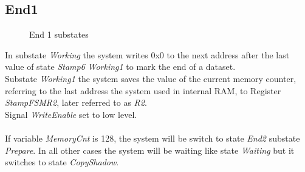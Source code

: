 \subsection{End1}
\begin{figure}[htb] 
\begin{center}
\end{center}
\caption{End 1 substates}
\end{figure}
\noindent
In substate \textit{Working} the system writes 0x0 to the next address after the last value of state \textit{Stamp6} \textit{Working1} to mark the end of a dataset. \\
Substate \textit{Working1} the system saves the value of the current memory counter, referring to the last address the system used in internal RAM, to Register \textit{StampFSMR2}, later referred to as \textit{R2}. \\
Signal \textit{WriteEnable} set to low level. \\\\ 
If variable \textit{MemoryCnt} is 128, the system will be switch to state \textit{End2} substate \textit{Prepare}. In all other cases the system will be waiting like state \textit{Waiting} but it switches to state \textit{CopyShadow}. 
